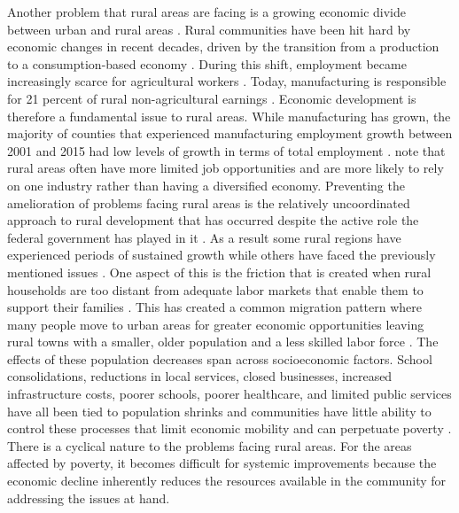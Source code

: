  Another problem that rural areas are facing is a growing economic divide between urban and rural areas \citep{bjerke_mover_2019}.  Rural communities have been hit hard by economic changes in recent decades, driven by the transition from a production to a consumption-based economy \citep{pendall_future_2016}. During this shift, employment became increasingly scarce for agricultural workers \citep{kropczynski_insights_2012}. Today, manufacturing is responsible for 21 percent of rural non-agricultural earnings \citep{low_rural_2017}. Economic development is therefore a fundamental issue to rural areas. While manufacturing has grown, the majority of counties that experienced manufacturing employment growth between 2001 and 2015 had low levels of growth in terms of total employment \citep{low_rural_2017}. \citet{blank_poverty_2005} note that rural areas often have more limited job opportunities and are more likely to rely on one industry rather than having a diversified economy. Preventing the amelioration of problems facing rural areas is the relatively uncoordinated approach to rural development that has occurred despite the active role the federal government has played in it \citep{wilson_rural_2016}. As a result some rural regions have experienced periods of sustained growth while others have faced the previously mentioned issues \citep{johnson_rural_2012}. One aspect of this is the friction that is created when rural households are too distant from adequate labor markets that enable them to support their families \citep{sparks_poverty_2013}. This has created a common migration pattern where many people move to urban areas for greater economic opportunities leaving rural towns with a smaller, older population and a less skilled labor force \citep{bjerke_mover_2019}. The effects of these population decreases span across socioeconomic factors. School consolidations, reductions in local services, closed businesses, increased infrastructure costs, poorer schools, poorer healthcare, and limited public services have all been tied to population shrinks and communities have little ability to control these processes that limit economic mobility and can perpetuate poverty \citep{martinez_rural_2021}. There is a cyclical nature to the problems facing rural areas. For the areas affected by poverty, it becomes difficult for systemic improvements because the economic decline inherently reduces the resources available in the community for addressing the issues at hand.

